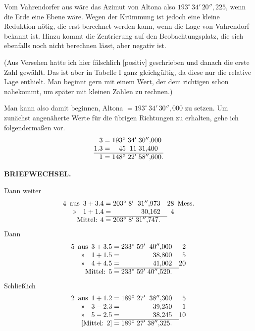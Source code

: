 Vom Vahrendorfer  aus wäre das Azimut von Altona also \(193^\circ\,34'\,20''{,}225\), wenn die Erde eine Ebene wäre. Wegen der Krümmung ist jedoch eine kleine Reduktion nötig, die erst berechnet werden kann, wenn die Lage von Vahrendorf bekannt ist. Hinzu kommt die Zentrierung auf den Beobachtungsplatz, die sich ebenfalls noch nicht berechnen lässt, aber negativ ist.

(Aus Versehen hatte ich hier fälschlich [positiv] geschrieben und danach die erste Zahl gewählt. Das ist aber in Tabelle I ganz gleichgültig, da diese nur die relative Lage enthielt. Man beginnt gern mit einem Wert, der dem richtigen schon nahekommt, um später mit kleinen Zahlen zu rechnen.)

Man kann also damit beginnen, Altona \(=193^\circ\,34'\,30''{,}000\) zu setzen. Um zunächst angenäherte Werte für die übrigen Richtungen zu erhalten, gehe ich folgendermaßen vor.
\[
\begin{array}{@{}r@{\;=\;}r@{\;}r@{\;}l@{}}
 3&193^\circ&34'&30''{,}000\\
 1.3&45&11&31{,}400\\
 \hline
 1&148^\circ&22'&58''{,}600.
\end{array}
\]
\par\noindent\makebox[.86\linewidth][r]{36\textsuperscript{*}}\par

\par\clearpage
\noindent{}\hfill{\small\textbf{BRIEFWECHSEL.}}\hfill\null\par\medskip

Dann weiter
\[
\begin{array}{@{}r@{\enspace}c@{\enspace}r@{\;}c@{\;}r@{\;}r@{\;}r@{\quad}r@{\enspace}l@{}}
 4&\text{aus}&3+3.4&=&203^\circ&8'&31''{,}973&28&\text{Mess.}\\
 &\text{»}&1+1.4&=& &&30{,}162&4&\\
 \cline{4-7}
 \multicolumn{3}{r@{\;}}{\text{Mittel: }4}&=&203^\circ&8'&31''{,}747.& &
\end{array}
\]
\indent Dann
\[
\begin{array}{@{}r@{\enspace}c@{\enspace}r@{\;}c@{\;}r@{\;}r@{\;}r@{\quad}r@{}}
 5&\text{aus}&3+3.5&=&233^\circ&59'&40''{,}000&2\\
 &\text{»}&1+1.5&=& &&38{,}800&5\\
 &\text{»}&4+4.5&=& &&41{,}002&20\\
 \cline{4-7}
 \multicolumn{3}{r@{\;}}{\text{Mittel: }5}&=&233^\circ&59'&40''{,}520.&
\end{array}
\]
\indent Schließlich
\[
\begin{array}{@{}r@{\enspace}c@{\enspace}r@{\;}c@{\;}r@{\;}r@{\;}r@{\quad}r@{}}
 2&\text{aus}&1+1.2&=&189^\circ&27'&38''{,}300&5\\
 &\text{»}&3-2.3&=& &&39{,}250&1\\
 &\text{»}&5-2.5&=& &&38{,}245&10\\
 \cline{4-7}
 \multicolumn{3}{r@{\;}}{\text{[Mittel: }2]}&=&189^\circ&27'&38''{,}325.&
\end{array}
\]

